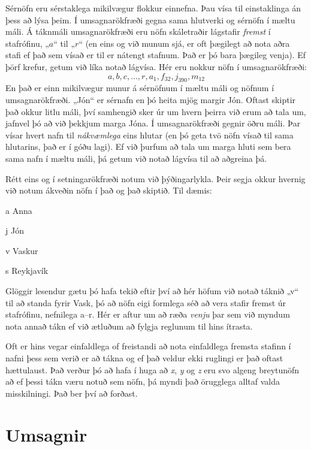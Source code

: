 Sérnöfn eru sérstaklega mikilvægur flokkur einnefna. Þau vísa til einstaklinga án þess að lýsa þeim. Í umsagnarökfræði gegna  sama hlutverki og sérnöfn í mæltu máli. Á táknmáli umsagnarökfræði eru nöfn skáletraðir lágstafir \emph{fremst} í stafrófinu, „$a$“ til „$r$“ (en eins og við munum sjá, er oft þægilegt að nota aðra stafi ef það sem vísað er til er nátengt stafnum. Það er þó bara þægileg venja). Ef þörf krefur, getum við líka notað lágvísa. Hér eru nokkur nöfn í umsagnarökfræði:
	$$a,b,c,\ldots, r, a_1, f_{32}, j_{390}, m_{12}$$
En það er einn mikilvægur munur á sérnöfnum í mæltu máli og nöfnum í umsagnarökfræði. „Jón“ er sérnafn en þó heita mjög margir Jón. Oftast skiptir það okkur litlu máli, því samhengið sker úr um hvern þeirra við erum að tala um, jafnvel þó að við þekkjum marga Jóna. Í umsagnarökfræði gegnir öðru máli. Þar vísar hvert nafn til \emph{nákvæmlega} eins hlutar (en þó geta tvö nöfn vísað til sama hlutarins, það er í góðu lagi). Ef við þurfum að tala um marga hluti sem bera sama nafn í mæltu máli, þá getum við notað lágvísa til að aðgreina þá.

Rétt eins og í setningarökfræði notum við þýðingarlykla. Þeir segja okkur hvernig við notum ákveðin nöfn í það og það skiptið. Til dæmis:
	
	\begin{ekey}
		\item[a] Anna
		\item[j] Jón
		\item[v] Vaskur
		\item[s] Reykjavík
	\end{ekey}
	
Glöggir lesendur gætu þó hafa tekið eftir því að hér höfum við notað táknið „v“ til að standa fyrir Vask, þó að nöfn eigi formlega séð að vera stafir fremst úr stafrófinu, nefnilega a--r. Hér er aftur um að ræða \emph{venju} þar sem við myndum nota annað tákn ef við ætluðum að fylgja reglunum til hins ítrasta. 

Oft er hins vegar einfaldlega of freistandi að nota einfaldlega fremsta stafinn í nafni þess sem verið er að tákna og ef það veldur ekki ruglingi er það oftast hættulaust. Það verður þó að hafa í huga að \emph{x}, \emph{y} og \emph{z} eru svo algeng breytunöfn að ef þessi tákn væru notuð sem nöfn, þá myndi það örugglega alltaf valda misskilningi. Það ber því að forðast.

\section{Umsagnir}

